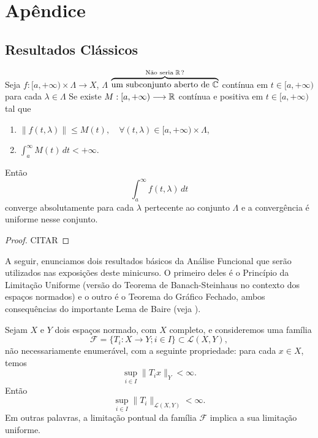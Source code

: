                                  
                            \chapter{Apêndice}

\section{Resultados Clássicos}


\begin{proposition}\label{TWeierstrass}
Seja $f:[a,+\infty)\times \Lambda\longrightarrow X$, $\Lambda$ 
$\overbrace{\text{um subconjunto aberto de }\mathbb{C}}^{\text{Não seria } \mathbb{R}\,?}$ 
 contínua em $t\in [a,+\infty)$ para cada $\lambda \in \Lambda$ Se existe $M:[a,+\infty)\longrightarrow \mathbb{R}$ contínua e positiva em $t\in [a,+\infty)$ tal que
\begin{enumerate}[$(i)$]
\item $\|f(t,\lambda)\|\leq M(t),\quad \forall (t,\lambda)\in [a,+\infty)\times \Lambda$,
\item $\displaystyle \int_a^\infty M(t)\, dt<+\infty$.
\end{enumerate} 
Então 
\[\int_a^\infty f(t,\lambda)\, dt\]
converge absolutamente para cada $\lambda $ pertecente ao conjunto $\Lambda$ e a convergência é uniforme nesse conjunto.
\end{proposition}
\begin{proof}
{\color{red}CITAR}
\end{proof}


A seguir, enunciamos dois resultados básicos da Análise Funcional que serão utilizados nas exposições deste minicurso. O primeiro deles é o Princípio da Limitação Uniforme (versão do Teorema de Banach-Steinhaus no contexto dos espaços normados) e o outro é o Teorema do Gráfico Fechado, ambos consequências do importante Lema de Baire (veja \cite{pombo1999introduccao}).

\begin{theorem}\label{th-BS}
	Sejam $X$ e $Y$ dois espaços normado, com $X$ completo, e consideremos uma família
    \[
    \displaystyle \mathcal F =\{T_i :X\longrightarrow Y; i\in I\} \subset \mathcal L (X,Y),
    \]
    não necessariamente enumerável, com a seguinte propriedade: para cada $x\in X$, temos
    \[
    \sup_{i\in I}\|T_ix\|_{Y} < \infty .
    \] 
    Então 
    \[
    \sup_{i\in I}\|T_i\|_{\mathcal{L}(X,Y)}<\infty.
    \]
    Em outras palavras, a limitação pontual da família $\mathcal F$ implica a sua limitação uniforme. 
\end{theorem}

